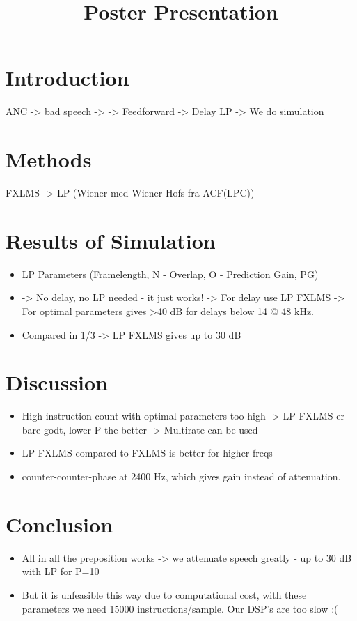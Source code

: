 \documentclass[12pt,a4paper,openright]{article}
\begin{document}
\title{Poster Presentation}

\section{Introduction}
	ANC -> bad speech -> -> Feedforward -> Delay LP -> We do simulation

\section{Methods}
	FXLMS -> LP (Wiener med Wiener-Hofs fra ACF(LPC))
	
\section{Results of Simulation}
	\begin{itemize}
		\item LP Parameters (Framelength, N - Overlap, O - Prediction Gain, PG)
		\item -> No delay, no LP needed - it just works! -> For delay use LP FXLMS
	-> For optimal parameters gives >40 dB for delays below 14 @ 48 kHz.
		\item Compared in 1/3 -> LP FXLMS gives up to 30 dB
	\end{itemize}
\section{Discussion}
\begin{itemize}
	\item 	High instruction count with optimal parameters too high -> LP FXLMS er bare godt, lower P the better -> Multirate can be used
	\item LP FXLMS compared to FXLMS is better for higher freqs
	\item counter-counter-phase at 2400 Hz, which gives gain instead of attenuation.
\end{itemize}
\section{Conclusion}
	\begin{itemize}
		\item All in all the preposition works -> we attenuate speech greatly - up to 30 dB with LP for P=10
		\item But it is unfeasible this way due to computational cost, with these parameters we need 15000 instructions/sample. Our DSP's are too slow :(
	\end{itemize}
\end{document}
